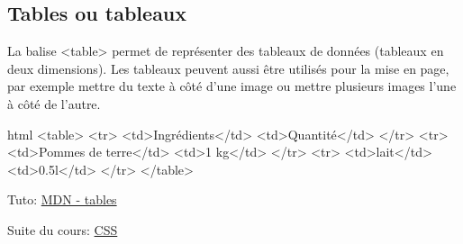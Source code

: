 \documentclass[a4paper,11pt]{article}
\begin{document}
\subsection{Tables ou tableaux}
La balise <table> permet de représenter des tableaux de données (tableaux en deux dimensions). Les tableaux peuvent aussi être utilisés pour la mise en page, par exemple mettre du texte à côté d'une image ou mettre plusieurs images l'une à côté de l'autre.
\begin{code}{html}
<table>
  <tr>
    <td>Ingrédients</td>
    <td>Quantité</td>
  </tr>
  <tr>
    <td>Pommes de terre</td>
    <td>1 kg</td>
  </tr>
  <tr>
    <td>lait</td>
    <td>0.5l</td>
  </tr>
</table>
\end{code}
Tuto: \href{https://developer.mozilla.org/fr/docs/Web/HTML/Element/table}{MDN - tables}\par

Suite du cours: \href{../Informatique/CSS}{CSS}
\end{document}
